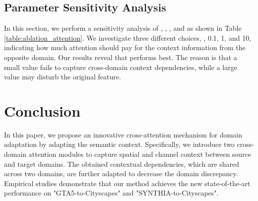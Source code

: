 \documentclass[10pt,twocolumn,letterpaper]{article}
\begin{document}
	\subsection{Parameter Sensitivity Analysis}

	In this section, we perform a sensitivity analysis of , , , and  as shown in Table \ref{table:ablation_attention}. We investigate three different choices, \ie, 0.1, 1, and 10, indicating how much attention should pay for the context information from the opposite domain. Our results reveal that  performs best. The reason is that a small value fails to capture cross-domain context dependencies, while a large value may disturb the original feature.

	\iffalse
	\begin{figure}[t]
		\begin{center}
			\texttt{[image: attention-eps-converted-to.pdf]}
		\end{center}
		\caption{An example of channel attention map.}
		\label{fig:channel_attention_map}
		\vspace{-0.2in}
	\end{figure}
	\fi

	\section{Conclusion}

	In this paper, we propose an innovative cross-attention mechanism for domain adaptation
	by adapting the semantic context. Specifically, we introduce two cross-domain attention modules to capture spatial and channel context between source and target domains. The obtained contextual dependencies, which are shared across two domains, are further adapted to decrease the domain discrepancy. Empirical studies demonstrate that our method achieves the new state-of-the-art performance on "GTA5-to-Cityscapes" and "SYNTHIA-to-Cityscapes".

	{\small
		
		
	}
\end{document}
